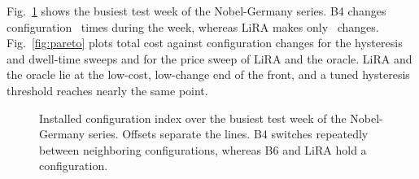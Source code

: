 \documentclass[journal]{IEEEtran}
\begin{document}
Fig.~\ref{fig:case} shows the busiest test week of the Nobel-Germany series. B4 changes configuration \caseBFourchg\ times during the week, whereas LiRA makes only \caseLiRAchg\ changes. Fig.~\ref{fig:pareto} plots total cost against configuration changes for the hysteresis and dwell-time sweeps and for the price sweep of LiRA and the oracle. LiRA and the oracle lie at the low-cost, low-change end of the front, and a tuned hysteresis threshold reaches nearly the same point.

\begin{figure}[t]
\centering
{}
\caption{Installed configuration index over the busiest test week of the Nobel-Germany series. Offsets separate the lines. B4 switches repeatedly between neighboring configurations, whereas B6 and LiRA hold a configuration.}
\label{fig:case}
\end{figure}
\end{document}
